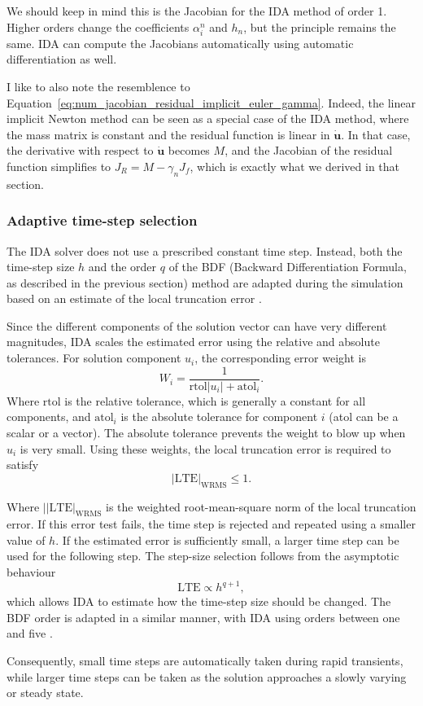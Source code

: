 We should keep in mind this is the Jacobian for the IDA method of order 1. Higher orders change the coefficients $\alpha_i^n$ and $h_n$, but the principle remains the same. IDA can compute the Jacobians automatically using automatic differentiation as well. 

I like to also note the resemblence to Equation~\ref{eq:num_jacobian_residual_implicit_euler_gamma}. Indeed, the linear implicit Newton method can be seen as a special case of the IDA method, where the mass matrix is constant and the residual function is linear in $\dot{\mathbf{u}}$. In that case, the derivative with respect to $\dot{\mathbf{u}}$ becomes $M$, and the Jacobian of the residual function simplifies to $J_R = M - \gamma_n J_f$, which is exactly what we derived in that section.

\subsubsection{Adaptive time-step selection}
\label{subsubsec:num_adaptive_timestep}

The IDA solver does not use a prescribed constant time step. Instead, both the time-step size $h$ and the order $q$ of the BDF (Backward Differentiation Formula, as described in the previous section) method are adapted during the simulation based on an estimate of the local truncation error \cite{hindmarsh2005sundials,sundials_ida_math}.

Since the different components of the solution vector can have very different magnitudes, IDA scales the estimated error using the relative and absolute tolerances. For solution component $u_i$, the corresponding error weight is
\begin{equation}
W_i=\frac{1}{\mathrm{rtol}|u_i|+\mathrm{atol}_i}.
\end{equation}
Where $\mathrm{rtol}$ is the relative tolerance, which is generally a constant for all components, and $\mathrm{atol}_i$ is the absolute tolerance for component $i$ (atol can be a scalar or a vector). The absolute tolerance prevents the weight to blow up when $u_i$ is very small. Using these weights, the local truncation error is required to satisfy
\begin{equation}
|\mathrm{LTE}|_{\mathrm{WRMS}}\leq 1.
\end{equation}

Where $||\mathrm{LTE}|_{\mathrm{WRMS}}$ is the weighted root-mean-square norm of the local truncation error. If this error test fails, the time step is rejected and repeated using a smaller value of $h$. If the estimated error is sufficiently small, a larger time step can be used for the following step. The step-size selection follows from the asymptotic behaviour
\begin{equation}
\mathrm{LTE}\propto h^{q+1},
\end{equation}
which allows IDA to estimate how the time-step size should be changed. The BDF order is adapted in a similar manner, with IDA using orders between one and five \cite{sundials_ida_math}.

Consequently, small time steps are automatically taken during rapid transients, while larger time steps can be taken as the solution approaches a slowly varying or steady state.
